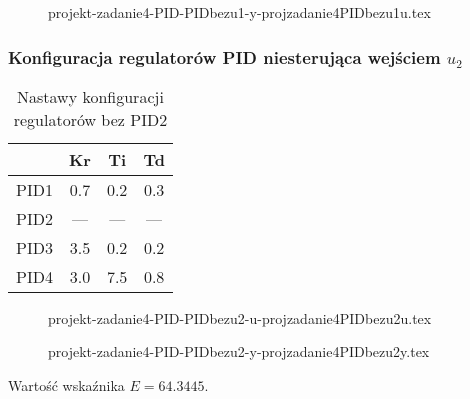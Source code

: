 \ifdefined\CompileFigures
    \begin{figure}[H] 
        \centering
        
        \caption{projekt-zadanie4-PID-PIDbezu1-y-projzadanie4PIDbezu1u.tex}
        \label{projekt:zad4:figure:yprojzadanie4PIDbezu1u}
    \end{figure}
\fi

\subsubsection{Konfiguracja regulatorów PID niesterująca wejściem $u_{2}$}

\begin{table}[H]
    \centering
    \begin{tabular}{|l|c|c|c|}
    \hline
         & Kr  & Ti  & Td  \\ \hline
    PID1 & 0.7 & 0.2 & 0.3 \\ \hline
    PID2 & --- & --- & ---  \\ \hline
    PID3 & 3.5 & 0.2 & 0.2 \\ \hline
    PID4 & 3.0 & 7.5 & 0.8 \\ \hline
    \end{tabular}
    \caption[H]{Nastawy konfiguracji regulatorów bez PID2}
\end{table}

\ifdefined\CompileFigures
    \begin{figure}[H] 
        \centering
        
        \caption{projekt-zadanie4-PID-PIDbezu2-u-projzadanie4PIDbezu2u.tex}
        \label{projekt:zad4:figure:projzadanie4PIDbezu2u}
    \end{figure}
\fi

\ifdefined\CompileFigures
    \begin{figure}[H] 
        \centering
        
        \caption{projekt-zadanie4-PID-PIDbezu2-y-projzadanie4PIDbezu2y.tex}
        \label{projekt:zad4:figure:projzadanie4PIDbezu2y}
    \end{figure}
\fi

Wartość wskaźnika $E=\num{64.3445}$.

